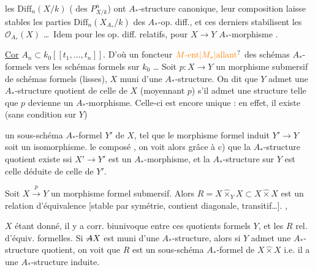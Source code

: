  les $\mathrm{Diff}_n(X/k)$ ( des $P^n_{X/k}$) ont  $A_*$-structure canonique, leur composition  laisse stables les parties $\mathrm{Diff}_n(X_{A_*}/k)$ des $A_*$-op. diff., et ces derniers stabilisent les  $\mathcal O_{A_*}(X)$ \ldots\ Idem pour les op. diff. relatifs, pour $X\to Y$ $A_*$-morphisme .

\uline{Cor} $A_n\subset k_0[[t_1,\ldots,t_n]]$.  D'où un foncteur $\unsure{M\text{-ent}|M_*|\text{allant}}$  des schémas $A_*$-formels vers les schémas  formels sur $k_0$ \ldots
Soit $p:X\to Y$ un morphisme submersif de schémas formels (lisses),  $X$ muni d'une $A_*$-structure. On dit que $Y$ admet une $A_*$-structure quotient de celle de $X$ (moyennant $p$) s'il admet une  structure telle que $p$ devienne un $A_*$-morphisme. Celle-ci est encore unique : en effet, il existe (sans condition sur $Y$)

un  sous-schéma $A_*$-formel $Y'$ de $X$, tel que le morphisme formel induit $Y'\to Y$ soit un isomorphisme.  le composé
, on voit alors grâce à c) que la $A_*$-structure quotient existe ssi $X'\to Y'$ est un $A_*$-morphisme, et la $A_*$-structure sur $Y$ est celle déduite de celle de $Y'$.

 Soit $X\xrightarrow{p}Y$ un morphisme formel submersif. Alors $R=X\mathbin{\widehat{\times}}_Y X\subset X\mathbin{\widehat{\times}}X$ est un  relation d'équivalence [stable par symétrie, contient diagonale, transitif\ldots]. ,

$X$ étant donné, il y a corr. biunivoque entre ces quotients formels $Y$, et les $R$ rel. d'équiv. formelles. Si $\deleted{A}X$ est muni d'une $A_*$-structure, alors si $Y$ admet une $A_*$-structure quotient, on voit que $R$ est un sous-schéma $A_*$-formel de $X\mathbin{\widehat{\times}}X$ i.e. il a une $A_*$-structure induite.

